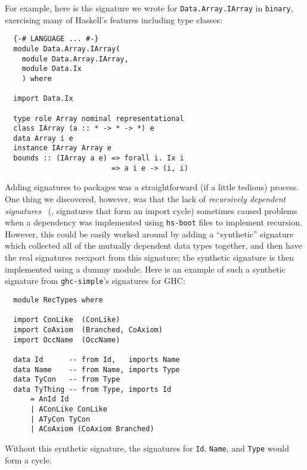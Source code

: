 For example, here is the signature we wrote for \texttt{Data.\allowbreak{}Array.\allowbreak{}IArray}
in \texttt{binary}, exercising many of Haskell's features including
type classes:

\begin{verbatim}
  {-# LANGUAGE ... #-}
  module Data.Array.IArray(
    module Data.Array.IArray,
    module Data.Ix
    ) where

  import Data.Ix

  type role Array nominal representational
  class IArray (a :: * -> * -> *) e
  data Array i e
  instance IArray Array e
  bounds :: (IArray a e) => forall i. Ix i
                         => a i e -> (i, i)
\end{verbatim}
%
Adding signatures to packages was a straightforward (if a little tedious)
process.  One thing we discovered, however, was that the lack of
\emph{recursively dependent signatures}~\cite{crary+:recmod-pldi}
(\ie, signatures that form an import cycle)
sometimes caused problems when a
dependency was implemented using \texttt{hs-boot} files to implement
recursion.  However, this could be easily worked around by adding
a ``synthetic'' signature which collected all of the mutually dependent
data types together, and then have the real signatures reexport
from this signature;  the synthetic signature is then implemented using
a dummy module.  Here is an example of such a synthetic signature
from \texttt{ghc-simple}'s signatures for GHC\@:

\begin{verbatim}
  module RecTypes where

  import ConLike  (ConLike)
  import CoAxiom  (Branched, CoAxiom)
  import OccName  (OccName)

  data Id      -- from Id,   imports Name
  data Name    -- from Name, imports Type
  data TyCon   -- from Type
  data TyThing -- from Type, imports Id
      = AnId Id
      | AConLike ConLike
      | ATyCon TyCon
      | ACoAxiom (CoAxiom Branched)
\end{verbatim}
Without this synthetic signature, the signatures for \texttt{Id}, \texttt{Name},
and \texttt{Type} would form a cycle.
